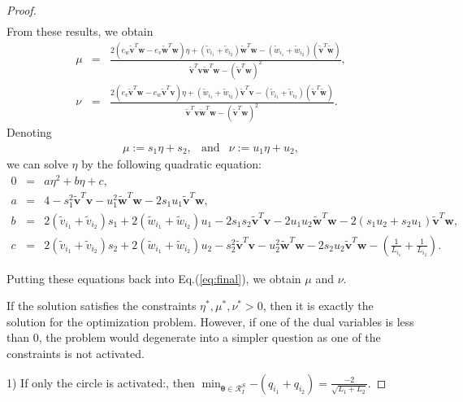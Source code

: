 \documentclass[11pt]{article}
\renewcommand{\vec}[1]{\bm{#1}}
\begin{document}
\begin{proof}
\begin{eqnarray*}
\end{eqnarray*}
From these results, we obtain
\begin{eqnarray*}
\mu &=& \frac{2( e_w\tilde{\vec{v}}^T{\vec{w}} - e_v\tilde{\vec{w}}^{T}\vec{w} )\eta + (\tilde{v}_{i_1}+\tilde{v}_{i_2})\tilde{\vec{w}}^{T}\vec{w} - (\tilde{w}_{i_1} + \tilde{w}_{i_2}) (\tilde{\vec{v}}^T\tilde{\vec{w}})}{ \tilde{\vec{v}}^{T}\vec{v} \tilde{\vec{w}}^{T}\vec{w} -(\tilde{\vec{v}}^T{\vec{w}})^2},\\
\nu &=&\frac{2( e_v\tilde{\vec{v}}^T{\vec{w}} - e_w\tilde{\vec{v}}^{T}\vec{v} )\eta + (\tilde{w}_{i_1}+\tilde{w}_{i_2}) \tilde{\vec{v}}^{T}\vec{v} - (\tilde{v}_{i_1} + \tilde{v}_{i_2}) (\tilde{\vec{v}}^T\tilde{\vec{w}})}{ \tilde{\vec{v}}^{T}\vec{v} \tilde{\vec{w}}^{T}\vec{w} -(\tilde{\vec{v}}^T{\vec{w}})^2}.
\end{eqnarray*}
Denoting %
\begin{eqnarray}
\label{eq:final}
\mu := s_1 \eta + s_2, &\text{and}& \nu := u_1 \eta + u_2,
\end{eqnarray}
we can solve $\eta$ by the following quadratic equation:
\begin{eqnarray*}
0&=&a\eta^2+b\eta+c,\\
a&=&4 - s_1^2\tilde{\vec{v}}^{T}\vec{v} - u_1^2\tilde{\vec{w}}^{T}\vec{w} -2s_1 u_1\tilde{\vec{v}}^T{\vec{w}},\\
b&=&2(\tilde{v}_{i_1} + \tilde{v}_{i_2})s_1 +2(\tilde{w}_{i_1} + \tilde{w}_{i_2})u_1 - 2s_1s_2 \tilde{\vec{v}}^{T}\vec{v} - 2u_1u_2\tilde{\vec{w}}^{T}\vec{w} - 2(s_1u_2+s_2u_1)\tilde{\vec{v}}^T{\vec{w}},\\
c&=&2(\tilde{v}_{i_1} + \tilde{v}_{i_2})s_2 +2(\tilde{w}_{i_1} + \tilde{w}_{i_2})u_2 -s_2^2\tilde{\vec{v}}^{T}\vec{v} -u_2^2\tilde{\vec{w}}^{T}\vec{w} - 2s_2u_2\tilde{\vec{v}}^T{\vec{w}} -(\frac{1}{L_{i_1}}+\frac{1}{L_{i_2}}).
\end{eqnarray*}

Putting these equations back into Eq.(\ref{eq:final}), we obtain $\mu$ and $\nu$.

If the solution satisfies the constraints $\eta^{*}, \mu^{*}, \nu^{*} > 0$, then it is exactly the solution for the optimization problem.
However, if one of the dual variables is less than 0, the problem would degenerate into a simpler question as one of the constraints is not activated.

1) If only the circle is activated:, then $\min_{\vec{\theta} \in \mathcal{R}^{S}_{I}}{- ( {q}_{i_1} +{q}_{i_2} )} = \frac{-2}{\sqrt{L_1 + L_2}}$.


\end{proof}
\end{document}
